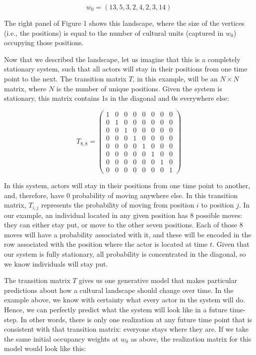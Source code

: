 \documentclass[
  11pt,
]{article}
\begin{document}
\[
w_0 = (13,5,3,2,4,2,3,14)
\]

The right panel of Figure 1 shows this landscape, where the size of the
vertices (i.e., the positions) is equal to the number of cultural units
(captured in \(w_0\)) occupying those positions.

Now that we described the landscape, let us imagine that this is a
completely stationary system, such that all actors will stay in their
positions from one time point to the next. The transition matrix \(T\),
in this example, will be an \(N \times N\) matrix, where \(N\) is the
number of unique positions. Given the system is stationary, this matrix
contains 1s in the diagonal and 0s everywhere else:

\[
T_{8,8} =
\begin{pmatrix}
1 & 0 & 0 & 0 & 0 & 0 & 0 & 0  \\
0 & 1 & 0 & 0 & 0 & 0 & 0 & 0  \\
0 & 0 & 1 & 0 & 0 & 0 & 0 & 0  \\
0 & 0 & 0 & 1 & 0 & 0 & 0 & 0  \\
0 & 0 & 0 & 0 & 1 & 0 & 0 & 0  \\
0 & 0 & 0 & 0 & 0 & 1 & 0 & 0  \\
0 & 0 & 0 & 0 & 0 & 0 & 1 & 0  \\
0 & 0 & 0 & 0 & 0 & 0 & 0 & 1 
\end{pmatrix}
\]

In this system, actors will stay in their positions from one time point
to another, and, therefore, have 0 probability of moving anywhere else.
In this transition matrix, \(T_{i,j}\) represents the probability of
moving from position \(i\) to position \(j\). In our example, an
individual located in any given position has 8 possible moves: they can
either stay put, or move to the other seven positions. Each of those 8
moves will have a probability associated with it, and these will be
encoded in the row associated with the position where the actor is
located at time \(t\). Given that our system is fully stationary, all
probability is concentrated in the diagonal, so we know individuals will
stay put.

The transition matrix \(T\) gives us one generative model that makes
particular predictions about how a cultural landscape should change over
time. In the example above, we know with certainty what every actor in
the system will do. Hence, we can perfectly predict what the system will
look like in a future time-step. In other words, there is only one
realization at any future time point that is consistent with that
transition matrix: everyone stays where they are. If we take the same
initial occupancy weights at \(w_0\) as above, the realization matrix
for this model would look like this:
\end{document}
